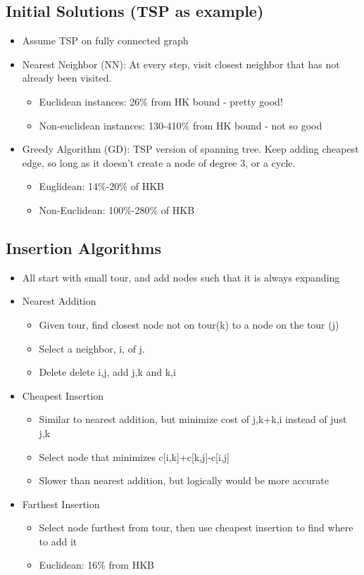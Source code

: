 \documentclass[12pt, letter]{article}
\begin{document}
\subsection*{Initial Solutions (TSP as example)}
\begin{itemize}
    \item Assume TSP on fully connected graph
    \item Nearest Neighbor (NN): At every step, visit closest neighbor that has not already been visited.
    \begin{itemize}
        \item Euclidean instances: 26\% from HK bound - pretty good!
        \item Non-euclidean instances: 130-410\% from HK bound - not so good
    \end{itemize}
    \item Greedy Algorithm (GD): TSP version of spanning tree. Keep adding cheapest edge, so long as it doesn't create a node of degree 3, or a cycle.
    \begin{itemize}
        \item Euglidean: 14\%-20\% of HKB
        \item Non-Euclidean: 100\%-280\% of HKB
    \end{itemize}
\end{itemize}

\subsection*{Insertion Algorithms}
\begin{itemize}
    \item All start with small tour, and add nodes such that it is always expanding
    \item Nearest Addition
    \begin{itemize}
        \item Given tour, find closest node not on tour(k) to a node on the tour (j)
        \item Select a neighbor, i, of j.
        \item Delete delete i,j, add j,k and k,i
    \end{itemize}
    \item Cheapest Insertion
    \begin{itemize}
        \item Similar to nearest addition, but minimize cost of j,k+k,i instead of just j,k
        \item Select node that minimizes c[i,k]+c[k,j]-c[i,j]
        \item Slower than nearest addition, but logically would be more accurate
    \end{itemize}
    \item Farthest Insertion
    \begin{itemize}
        \item Select node furthest from tour, then use cheapest insertion to find where to add it
        \item Euclidean: 16\% from HKB
    \end{itemize}
\end{itemize}
\end{document}
